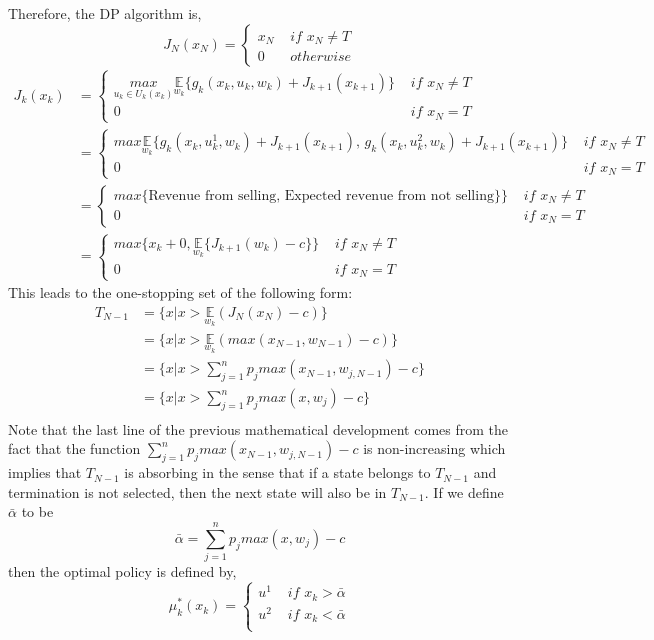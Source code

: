 \documentclass[11pt, oneside]{article}   	%
\begin{document}
Therefore, the DP algorithm is,
$$J_{N}(x_{N}) = \begin{cases}
				x_{N} \, \, & if \, \, x_{N} \neq T\\
				0 \, \,  & otherwise
			   \end{cases}
$$
\begin{align*}
J_{k}(x_{k}) &= 
\begin{cases}
				\underset{u_{k} \in U_{k}(x_{k})}{max} \underset{w_{k}}{\mathbb{E}} \big\{g_{k}(x_{k},u_{k},w_{k}) + J_{k+1}(x_{k+1})\big\} \, \, & if \, \, x_{N} \neq T\\
				0 \, \,  & if \, \, x_{N} = T
			   \end{cases}\\
			   &= 
\begin{cases}
				max \underset{w_{k}}{\mathbb{E}} \big\{g_{k}(x_{k},u_{k}^{1},w_{k}) + J_{k+1}(x_{k+1}), \, g_{k}(x_{k},u_{k}^{2},w_{k}) + J_{k+1}(x_{k+1})\big\} \, \, & if \, \, x_{N} \neq T\\
				0 \, \,  & if \, \, x_{N} = T
			   \end{cases}\\
			   &=
\begin{cases}
				max\big\{\text{Revenue from selling, Expected revenue from not selling}\}\big\} \, \, & if \, \, x_{N} \neq T\\
				0 \, \,  & if \, \, x_{N} = T
			   \end{cases}\\
			   &=
			   \begin{cases}
				max\big\{x_{k} + 0,\underset{w_{k}}{\mathbb{E}}\{J_{k+1}(w_{k})-c\}\big\} \, \, & if \, \, x_{N} \neq T\\
				0 \, \,  & if \, \, x_{N} = T
			   \end{cases}
\end{align*}
This leads to the one-stopping set of the following form:
\begin{align*}
T_{N-1} &= \big\{x | x > \underset{w_{k}}{\mathbb{E}} (J_{N}(x_{N}) - c)\big\}\\
&= \big\{x | x > \underset{w_{k}}{\mathbb{E}} (max(x_{N-1},w_{N-1}) - c)\big\}\\
&= \big\{x | x >  \sum_{j=1}^{n} p_{j} max(x_{N-1},w_{j,N-1}) - c\big\}\\
&= \big\{x | x >  \sum_{j=1}^{n} p_{j} max(x,w_{j}) - c\big\}\\
\end{align*}
Note that the last line of the previous mathematical development comes from the fact that the function $\sum_{j=1}^{n} p_{j} max(x_{N-1},w_{j,N-1}) - c$ is non-increasing which implies that $T_{N-1}$ is absorbing in the sense that if a state belongs to $T_{N-1}$ and termination is not selected, then the next state will also be in $T_{N-1}$. If we define $\bar{\alpha}$ to be
$$\bar{\alpha} = \sum_{j=1}^{n} p_{j} max(x,w_{j}) - c$$
then the optimal policy is defined by,
$$\mu_{k}^{*}(x_{k}) = \begin{cases}
				u^{1} \, \, & if \, \, x_{k} > \bar{\alpha}\\
				u^{2} \, \, & if \, \, x_{k} < \bar{\alpha}\\
			   \end{cases}
$$
\end{document}
